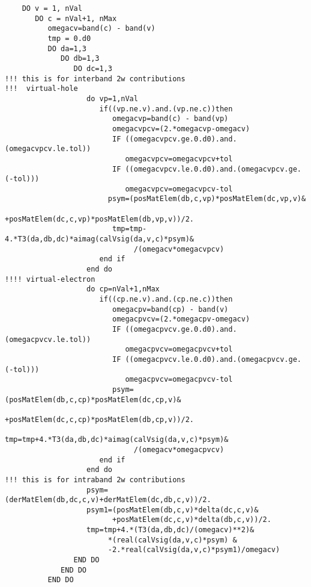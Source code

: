 \documentclass[letterpaper,10pt]{article}
\begin{document}
\begin{verbatim}
    DO v = 1, nVal
       DO c = nVal+1, nMax
          omegacv=band(c) - band(v)
          tmp = 0.d0
          DO da=1,3
             DO db=1,3
                DO dc=1,3
!!! this is for interband 2w contributions
!!!  virtual-hole 
                   do vp=1,nVal
                      if((vp.ne.v).and.(vp.ne.c))then
                         omegacvp=band(c) - band(vp)
                         omegacvpcv=(2.*omegacvp-omegacv)
                         IF ((omegacvpcv.ge.0.d0).and.(omegacvpcv.le.tol))
                            omegacvpcv=omegacvpcv+tol
                         IF ((omegacvpcv.le.0.d0).and.(omegacvpcv.ge.(-tol)))
                            omegacvpcv=omegacvpcv-tol
                        psym=(posMatElem(db,c,vp)*posMatElem(dc,vp,v)&
                             +posMatElem(dc,c,vp)*posMatElem(db,vp,v))/2.
                         tmp=tmp-4.*T3(da,db,dc)*aimag(calVsig(da,v,c)*psym)&
                              /(omegacv*omegacvpcv)
                      end if
                   end do
!!!! virtual-electron
                   do cp=nVal+1,nMax
                      if((cp.ne.v).and.(cp.ne.c))then
                         omegacpv=band(cp) - band(v)
                         omegacpvcv=(2.*omegacpv-omegacv)
                         IF ((omegacpvcv.ge.0.d0).and.(omegacpvcv.le.tol))
                            omegacpvcv=omegacpvcv+tol
                         IF ((omegacpvcv.le.0.d0).and.(omegacpvcv.ge.(-tol)))
                            omegacpvcv=omegacpvcv-tol
                         psym=(posMatElem(db,c,cp)*posMatElem(dc,cp,v)&
                              +posMatElem(dc,c,cp)*posMatElem(db,cp,v))/2.
                         tmp=tmp+4.*T3(da,db,dc)*aimag(calVsig(da,v,c)*psym)&
                              /(omegacv*omegacpvcv)
                      end if
                   end do
!!! this is for intraband 2w contributions 
                   psym=(derMatElem(db,dc,c,v)+derMatElem(dc,db,c,v))/2.
                   psym1=(posMatElem(db,c,v)*delta(dc,c,v)&
                         +posMatElem(dc,c,v)*delta(db,c,v))/2.
                   tmp=tmp+4.*(T3(da,db,dc)/(omegacv)**2)&
                        *(real(calVsig(da,v,c)*psym) &
                        -2.*real(calVsig(da,v,c)*psym1)/omegacv)
                END DO
             END DO
          END DO
\end{verbatim}
\end{document}
